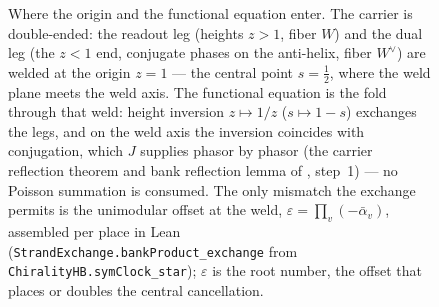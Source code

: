 \documentclass[11pt]{article}
\theoremstyle{definition}
\begin{document}
\begin{figure}[t]
{}
\caption{Where the origin and the functional equation enter. The carrier is
double-ended: the readout leg (heights \(z>1\), fiber \(W\)) and the dual
leg (the \(z<1\) end, conjugate phases on the anti-helix, fiber
\(W^{\vee}\)) are welded at the origin \(z=1\) --- the central point
\(s=\tfrac12\), where the weld plane meets the weld axis. The functional
equation is the fold through that weld: height inversion \(z\mapsto1/z\)
(\(s\mapsto1-s\)) exchanges the legs, and on the weld axis the inversion
coincides with conjugation, which \(J\) supplies phasor by phasor
(the carrier reflection theorem and bank reflection lemma of
\cite{UniversalCarrier}, step~1) --- no Poisson summation is consumed. The only mismatch the exchange
permits is the unimodular offset at the weld,
\(\varepsilon=\prod_v(-\bar\alpha_v)\), assembled per place in Lean
(\texttt{StrandExchange.bankProduct\_exchange} from
\texttt{ChiralityHB.symClock\_star}); \(\varepsilon\) is the root number,
the offset that places or doubles the central cancellation.}
\label{fig:grh-weld}
\end{figure}
\end{document}
